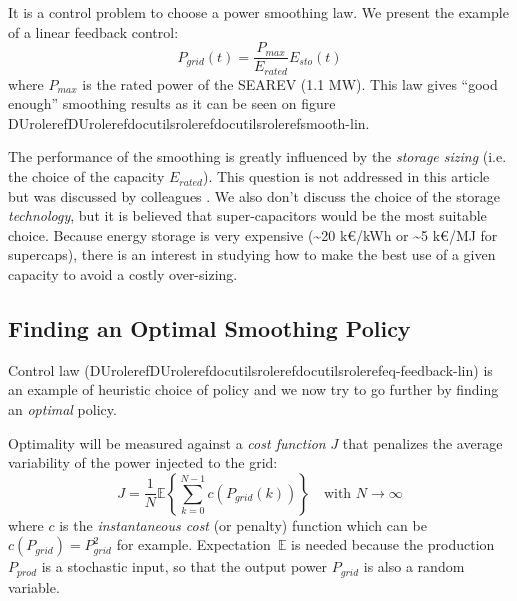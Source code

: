 \documentclass[letterpaper,compsoc,twoside]{IEEEtran}
\providecommand*{\DUrole}[2]{\ifcsname DUrole#1\endcsname \csname DUrole#1\endcsname{#2}\else \ifcsname docutilsrole#1\endcsname \csname docutilsrole#1\endcsname{#2}\else #2\fi \fi }
\begin{document}
It is a control problem to choose a power smoothing law. We present the
example of a linear feedback control:\begin{equation}
\label{eq-feedback-lin}
 P_{grid}(t) = \frac{P_{max}}{E_{rated}} E_{sto}(t)
\end{equation}where $P_{max}$ is the rated power of the SEAREV (1.1 MW). This law gives
“good enough” smoothing results as it can be seen on figure
\DUrole{ref}{smooth-lin}.

The performance of the smoothing is greatly influenced by the \emph{storage
sizing} (i.e. the choice of the capacity $E_{rated}$). This
question is not addressed in this article but was discussed by
colleagues \cite{Aubry-2010}. We also don’t discuss the choice of the
storage \emph{technology}, but it is believed that super-capacitors would be
the most suitable choice.
Because energy storage is very expensive (\textasciitilde{}20 k€/kWh or \textasciitilde{}5 k€/MJ for supercaps),
there is an interest in studying how to make the best use of a
given capacity to avoid a costly over-sizing.

\subsection{Finding an Optimal Smoothing Policy\label{finding-an-optimal-smoothing-policy}}


Control law (\DUrole{ref}{eq-feedback-lin}) is an example of heuristic choice
of policy and we now try
to go further by finding an \emph{optimal} policy.

Optimality will be measured against a \emph{cost function} $J$ that
penalizes the average variability of the power injected to the grid:\begin{equation}
\label{eq-cost}
J = \frac{1}{N} \mathbb{E} \left\lbrace
                   \sum_{k=0}^{N-1} c(P_{grid}(k))
                 \right\rbrace
                 \quad
                 \text{with $N \rightarrow \infty$}
\end{equation}where $c$ is the \emph{instantaneous cost} (or penalty) function which
can be $c(P_{grid}) = P_{grid}^2$ for example.
Expectation~$\mathbb{E}$ is needed because the production
$P_{prod}$ is a stochastic input, so that the output power
$P_{grid}$ is also a random variable.
\end{document}
